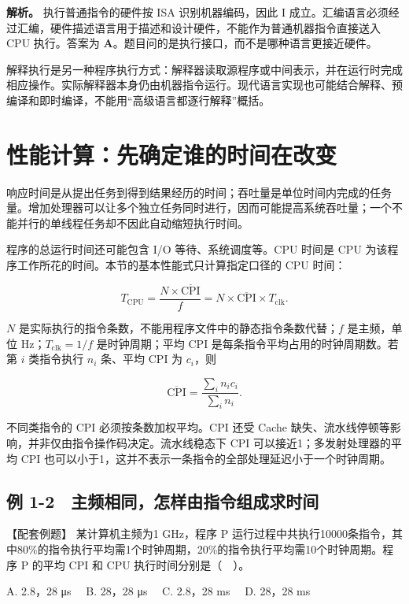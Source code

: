 \textbf{解析。} 执行普通指令的硬件按 ISA 识别机器编码，因此 I 成立。汇编语言必须经过汇编，硬件描述语言用于描述和设计硬件，不能作为普通机器指令直接送入 CPU 执行。答案为 \textbf{A}。题目问的是执行接口，而不是哪种语言更接近硬件。

解释执行是另一种程序执行方式：解释器读取源程序或中间表示，并在运行时完成相应操作。实际解释器本身仍由机器指令运行。现代语言实现也可能结合解释、预编译和即时编译，不能用``高级语言都逐行解释''概括。

\section{性能计算：先确定谁的时间在改变}\label{CO01-07}

响应时间是从提出任务到得到结果经历的时间；吞吐量是单位时间内完成的任务量。增加处理器可以让多个独立任务同时进行，因而可能提高系统吞吐量；一个不能并行的单线程任务却不因此自动缩短执行时间。

程序的总运行时间还可能包含 I/O 等待、系统调度等。CPU 时间是 CPU 为该程序工作所花的时间。本节的基本性能式只计算指定口径的 CPU 时间：

\[
T_{\mathrm{CPU}}=\frac{N\times\overline{\mathrm{CPI}}}{f}
=N\times\overline{\mathrm{CPI}}\times T_{\mathrm{clk}}.
\]

\(N\) 是实际执行的指令条数，不能用程序文件中的静态指令条数代替；\(f\) 是主频，单位 Hz；\(T_{\mathrm{clk}}=1/f\) 是时钟周期；平均 CPI 是每条指令平均占用的时钟周期数。若第 \(i\) 类指令执行 \(n_i\) 条、平均 CPI 为 \(c_i\)，则

\[
\overline{\mathrm{CPI}}=\frac{\sum_i n_i c_i}{\sum_i n_i}.
\]

不同类指令的 CPI 必须按条数加权平均。CPI 还受 Cache 缺失、流水线停顿等影响，并非仅由指令操作码决定。流水线稳态下 CPI 可以接近1；多发射处理器的平均 CPI 也可以小于1，这并不表示一条指令的全部处理延迟小于一个时钟周期。

\subsection{例 1-2　主频相同，怎样由指令组成求时间}\label{CO01-08}

\begin{example}[配套例题]

【配套例题】 某计算机主频为1 GHz，程序 P 运行过程中共执行10000条指令，其中80\%的指令执行平均需1个时钟周期，20\%的指令执行平均需10个时钟周期。程序 P 的平均 CPI 和 CPU 执行时间分别是（　）。

A. 2.8，28 μs　 B. 28，28 μs　 C. 2.8，28 ms　 D. 28，28 ms

\end{example}

